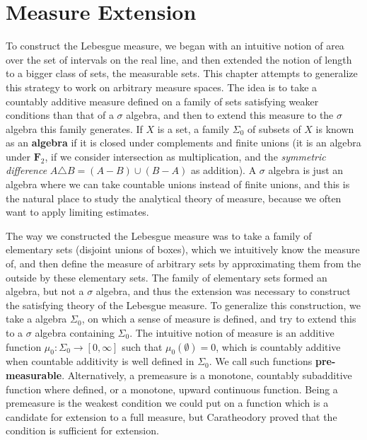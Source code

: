 \chapter{Measure Extension}

To construct the Lebesgue measure, we began with an intuitive notion of area over the set of intervals on the real line, and then extended the notion of length to a bigger class of sets, the measurable sets. This chapter attempts to generalize this strategy to work on arbitrary measure spaces. The idea is to take a countably additive measure defined on a family of sets satisfying weaker conditions than that of a $\sigma$ algebra, and then to extend this measure to the $\sigma$ algebra this family generates. If $X$ is a set, a family $\Sigma_0$ of subsets of $X$ is known as an {\bf algebra} if it is closed under complements and finite unions (it is an algebra under $\mathbf{F}_2$, if we consider intersection as multiplication, and the {\it symmetric difference} $A \triangle B = (A - B) \cup (B - A)$ as addition). A $\sigma$ algebra is just an algebra where we can take countable unions instead of finite unions, and this is the natural place to study the analytical theory of measure, because we often want to apply limiting estimates.

The way we constructed the Lebesgue measure was to take a family of elementary sets (disjoint unions of boxes), which we intuitively know the measure of, and then define the measure of arbitrary sets by approximating them from the outside by these elementary sets. The family of elementary sets formed an algebra, but not a $\sigma$ algebra, and thus the extension was necessary to construct the satisfying theory of the Lebesgue measure. To generalize this construction, we take a algebra $\Sigma_0$, on which a sense of measure is defined, and try to extend this to a $\sigma$ algebra containing $\Sigma_0$. The intuitive notion of measure is an additive function $\mu_0: \Sigma_0 \to [0,\infty]$  such that $\mu_0(\emptyset) = 0$, which is countably additive when countable additivity is well defined in $\Sigma_0$. We call such functions {\bf pre-measurable}. Alternatively, a premeasure is a monotone, countably subadditive function where defined, or a monotone, upward continuous function. Being a premeasure is the weakest condition we could put on a function which is a candidate for extension to a full measure, but Caratheodory proved that the condition is sufficient for extension.

